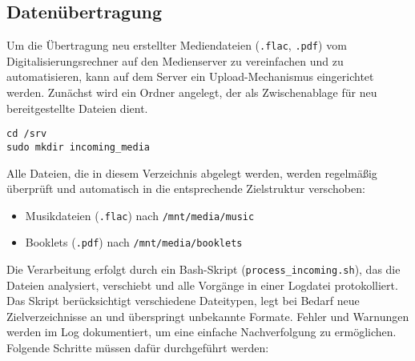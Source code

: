 \documentclass[12pt,a4paper]{report}
\begin{document}
    \subsection{Datenübertragung}
    Um die Übertragung neu erstellter Mediendateien (\texttt{.flac}, \texttt{.pdf}) vom Digitalisierungsrechner auf den Medienserver zu vereinfachen 
    und zu automatisieren, kann auf dem Server ein Upload-Mechanismus eingerichtet werden. 
    Zunächst wird ein Ordner angelegt, der als Zwischenablage für neu bereitgestellte Dateien dient. 

  \begin{verbatim}
cd /srv
sudo mkdir incoming_media
  \end{verbatim}

  Alle Dateien, die in diesem Verzeichnis abgelegt werden, werden regelmäßig überprüft 
  und automatisch in die entsprechende Zielstruktur verschoben:
  \begin{itemize}
    \item Musikdateien (\texttt{.flac}) nach \texttt{/mnt/media/music}
    \item Booklets (\texttt{.pdf}) nach \texttt{/mnt/media/booklets}
  \end{itemize}

  Die Verarbeitung erfolgt durch ein Bash-Skript (\texttt{process\_incoming.sh}), das die Dateien analysiert, 
  verschiebt und alle Vorgänge in einer Logdatei protokolliert. 
  Das Skript berücksichtigt verschiedene Dateitypen, legt bei Bedarf neue Zielverzeichnisse an und überspringt unbekannte Formate. 
  Fehler und Warnungen werden im Log dokumentiert, um eine einfache Nachverfolgung zu ermöglichen.
  Folgende Schritte müssen dafür durchgeführt werden:
\end{document}
